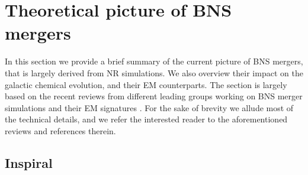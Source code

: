 %
%
%
%



\section{Theoretical picture of \ac{BNS} mergers}

In this section we provide a brief summary of the current picture of 
\ac{BNS} mergers, that is largely derived from \ac{NR} simulations.
We also overview their impact on the galactic chemical evolution, and their 
\ac{EM} counterparts. 
%
The section is largely based on the recent reviews from 
different leading groups working on \ac{BNS} merger simulations 
\citep{Radice:2020ddv,Bernuzzi:2020tgt,Shibata:2019wef} 
and their \ac{EM} signatures 
\citep{Kumar:2014upa,Fernandez:2015use,Metzger:2019zeh}.
%
For the sake of brevity we allude most of the technical details, 
and we refer the interested reader to the aforementioned  
reviews and references therein.


\subsection{Inspiral}

